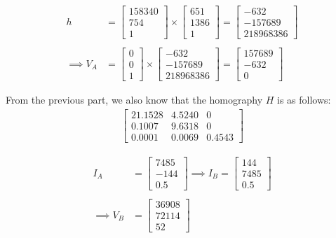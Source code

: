 \documentclass[12pt, oneside]{article}
\begin{document}
\begin{align*}
h   &=  \begin{bmatrix} 158340  \\ 754 \\ 1  \end{bmatrix} \times 
        \begin{bmatrix} 651   \\ 1386 \\   1   \end{bmatrix} 
    =  \begin{bmatrix} -632   \\ -157689   \\ 218968386   \end{bmatrix}  \\ \\   
\implies V_A  &=  \begin{bmatrix} 0   \\ 0   \\ 1   \end{bmatrix} \times
        \begin{bmatrix} -632   \\ -157689   \\ 218968386   \end{bmatrix} 
    =  \begin{bmatrix} 157689   \\ -632   \\ 0   \end{bmatrix} 
\end{align*}

From the previous part, we also know that the homography $H$ is as follows:
\begin{align*}
\begin{bmatrix}
    21.1528     &   4.5240  & 0 \\
    0.1007       &   9.6318   & 0 \\
    0.0001       &   0.0069 & 0.4543
\end{bmatrix}
\end{align*}

\begin{align*}
    I_A &= \begin{bmatrix} 7485 \\ -144 \\ 0.5 \end{bmatrix} \implies 
    I_B = \begin{bmatrix} 144 \\ 7485 \\ 0.5 \end{bmatrix}  \\ \\
    \implies  V_B &= \begin{bmatrix} 36908 \\ 72114 \\ 52 \end{bmatrix}  
\end{align*}
\end{document}

